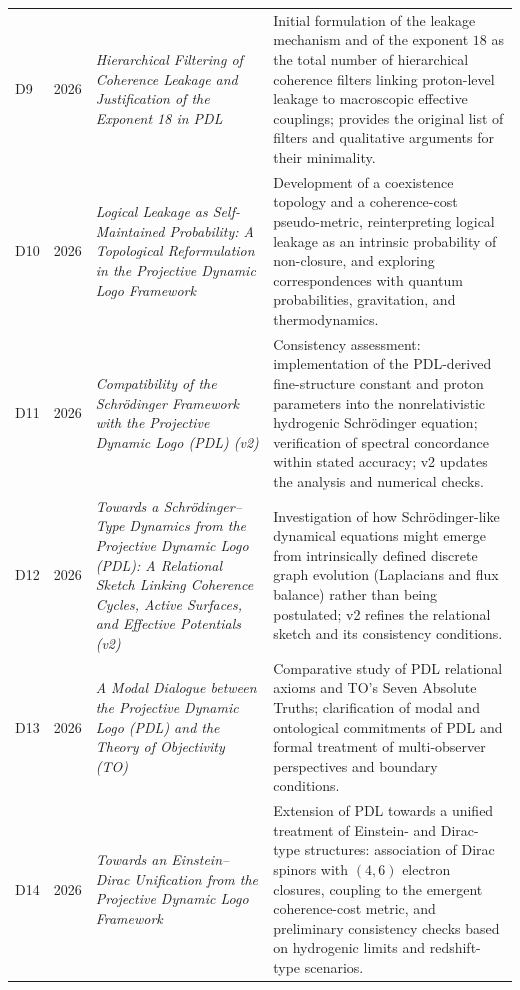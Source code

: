 \documentclass{article}
\begin{document}
\begin{longtable}{@{}llL{4cm}p{9.5cm}@{}}
D9 & 2026 & \textit{Hierarchical Filtering of Coherence Leakage and Justification of the Exponent 18 in PDL} &
Initial formulation of the leakage mechanism and of the exponent $18$ as the total number of hierarchical coherence filters linking proton-level leakage to macroscopic effective couplings; provides the original list of filters and qualitative arguments for their minimality. \cite{Exponent_18_PDL_2026} \\[0.5em]

D10 & 2026 & \textit{Logical Leakage as Self-Maintained Probability: A Topological Reformulation in the Projective Dynamic Logo Framework} &
Development of a coexistence topology and a coherence-cost pseudo-metric, reinterpreting logical leakage as an intrinsic probability of non-closure, and exploring correspondences with quantum probabilities, gravitation, and thermodynamics. \cite{Topological_Reformulation_PDL_2026} \\[0.5em]

D11 & 2026 & \textit{Compatibility of the Schr\"odinger Framework with the Projective Dynamic Logo (PDL) (v2)} &
Consistency assessment: implementation of the PDL-derived fine-structure constant and proton parameters into the nonrelativistic hydrogenic Schr\"odinger equation; verification of spectral concordance within stated accuracy; v2 updates the analysis and numerical checks. \cite{Schrodinger_PDL_v2_2026} \\[0.5em]

D12 & 2026 & \textit{Towards a Schr\"odinger--Type Dynamics from the Projective Dynamic Logo (PDL): A Relational Sketch Linking Coherence Cycles, Active Surfaces, and Effective Potentials (v2)} &
Investigation of how Schr\"odinger-like dynamical equations might emerge from intrinsically defined discrete graph evolution (Laplacians and flux balance) rather than being postulated; v2 refines the relational sketch and its consistency conditions. \cite{Schrodinger_Sketch_v2_2026} \\[0.5em]

D13 & 2026 & \textit{A Modal Dialogue between the Projective Dynamic Logo (PDL) and the Theory of Objectivity (TO)} &
Comparative study of PDL relational axioms and TO's Seven Absolute Truths; clarification of modal and ontological commitments of PDL and formal treatment of multi-observer perspectives and boundary conditions. \cite{PDL_TO_dialogue} \\[0.5em]

D14 & 2026 & \textit{Towards an Einstein--Dirac Unification from the Projective Dynamic Logo Framework} &
Extension of PDL towards a unified treatment of Einstein- and Dirac-type structures: association of Dirac spinors with $(4,6)$ electron closures, coupling to the emergent coherence-cost metric, and preliminary consistency checks based on hydrogenic limits and redshift-type scenarios. \cite{Einstein_Dirac_PDL_2026} \\[0.5em]


\end{longtable}
\end{document}
